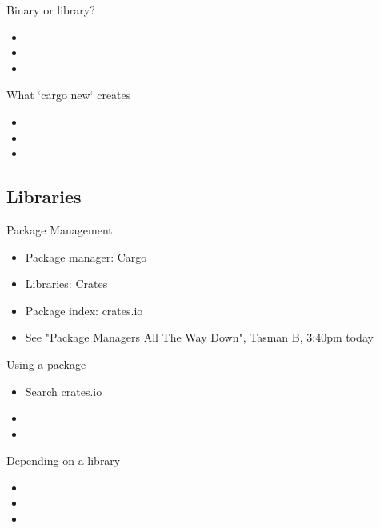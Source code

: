 \documentclass[50pt]{beamer}
\begin{document}
    \begin{frame}
        Binary or library?
        \begin{itemize}
            \item
            \item
            \item
        \end{itemize}
    \end{frame}

    \begin{frame}
        What `cargo new` creates
        \begin{itemize}
            \item
            \item
            \item
        \end{itemize}
    \end{frame}


\subsection{Libraries }

    \begin{frame}
        Package Management
        \begin{itemize}
            \item Package manager: Cargo
            \item Libraries: Crates
            \item Package index: crates.io
            \item See "Package Managers All The Way Down", Tasman B, 3:40pm today
        \end{itemize}
    \end{frame}

    \begin{frame}
        Using a package
        \begin{itemize}
            \item Search crates.io
            \item
            \item
        \end{itemize}
    \end{frame}


    \begin{frame}
        Depending on a library
        \begin{itemize}
            \item
            \item
            \item
        \end{itemize}
    \end{frame}
\end{document}
